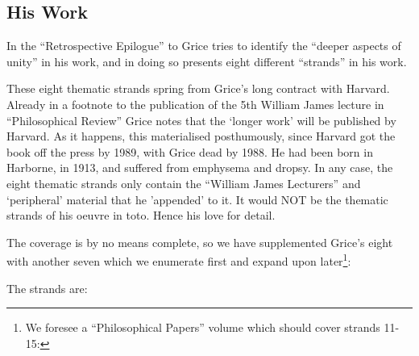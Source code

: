 \documentclass[10pt,titlepage]{book}
\begin{document}
\subsection{His Work}

In the ``Retrospective Epilogue'' to \cite{grice88} Grice tries to identify the ``deeper aspects of unity'' in his work, and in doing so presents eight different ``strands'' in his work.

These eight thematic strands spring from Grice's long contract with Harvard.
Already in a footnote to the publication of the 5th William James lecture in ``Philosophical Review'' Grice notes that the `longer work' will be published by Harvard.
As it happens, this materialised posthumously, since Harvard got the book off the press by 1989, with Grice dead by 1988.
He had been born in Harborne, in 1913, and suffered from emphysema and dropsy.
In any case, the eight thematic strands only contain the ``William James Lecturers'' and `peripheral' material that he 'appended' to it.
It would NOT be the thematic strands of his oeuvre in toto.
Hence his love for detail.

The coverage is by no means complete, so we have supplemented Grice's eight with another seven which we enumerate first and expand upon later\footnote{
We foresee a ``Philosophical Papers'' volume which should cover strands 11-15:
}:

The strands are:
\end{document}
